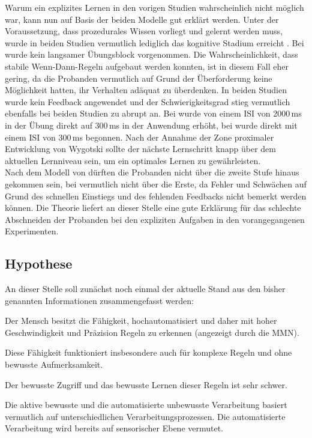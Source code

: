 \documentclass[doc,a4paper,12pt]{apa6}
\begin{document}
Warum ein explizites Lernen in den vorigen Studien \parencites{bendixen2008rapid}{paavilainen2007preattentive} wahrscheinlich nicht möglich war, kann nun auf Basis der beiden Modelle gut erklärt werden. Unter der Voraussetzung, dass prozedurales Wissen vorliegt und gelernt werden muss, wurde in beiden Studien vermutlich lediglich das kognitive Stadium erreicht \parencite[nach][]{fitts1967human}. Bei \textcite{bendixen2008rapid} wurde kein langsamer Übungsblock vorgenommen. Die Wahrscheinlichkeit, dass stabile Wenn-Dann-Regeln aufgebaut werden konnten, ist in diesem Fall eher gering, da die Probanden vermutlich auf Grund der Überforderung keine Möglichkeit hatten, ihr Verhalten adäquat zu überdenken. In beiden Studien wurde kein Feedback angewendet und der Schwierigkeitsgrad stieg vermutlich ebenfalls bei beiden Studien zu abrupt an. Bei \textcite{paavilainen2007preattentive} wurde von einem ISI von 2000\,ms in der Übung direkt auf 300\,ms in der Anwendung erhöht, bei \textcite{bendixen2008rapid} wurde direkt mit einem ISI von 300\,ms begonnen. Nach der Annahme der Zone proximaler Entwicklung von Wygotski \parencite{kozulin2003vygotsky} sollte der nächste Lernschritt knapp über dem aktuellen Lernniveau sein, um ein optimales Lernen zu gewährleisten.\\
Nach dem Modell von \textcite{whitmore2009coaching} dürften die Probanden nicht über die zweite Stufe hinaus gekommen sein, bei \textcite{bendixen2008rapid} vermutlich nicht über die Erste, da Fehler und Schwächen auf Grund des schnellen Einstiegs und des fehlenden Feedbacks nicht bemerkt werden können. Die Theorie liefert an dieser Stelle eine gute Erklärung für das schlechte Abschneiden der Probanden bei den expliziten Aufgaben in den vorangegangenen Experimenten.

\subsection{Hypothese}

An dieser Stelle soll zunächst noch einmal der aktuelle Stand aus den bisher genannten Informationen zusammengefasst werden:

\begin{compactitem}
\item Der Mensch besitzt die Fähigkeit, hochautomatisiert und daher mit hoher Geschwindigkeit und Präzision Regeln zu erkennen (angezeigt durch die MMN).
\item Diese Fähigkeit funktioniert insbesondere auch für komplexe Regeln und ohne bewusste Aufmerksamkeit.
\item Der bewusste Zugriff und das bewusste Lernen dieser Regeln ist sehr schwer.
\item Die aktive bewusste und die automatisierte unbewusste Verarbeitung basiert vermutlich auf unterschiedlichen Verarbeitungsprozessen. Die automatisierte Verarbeitung wird bereits auf sensorischer Ebene vermutet.
\end{compactitem}
\end{document}
